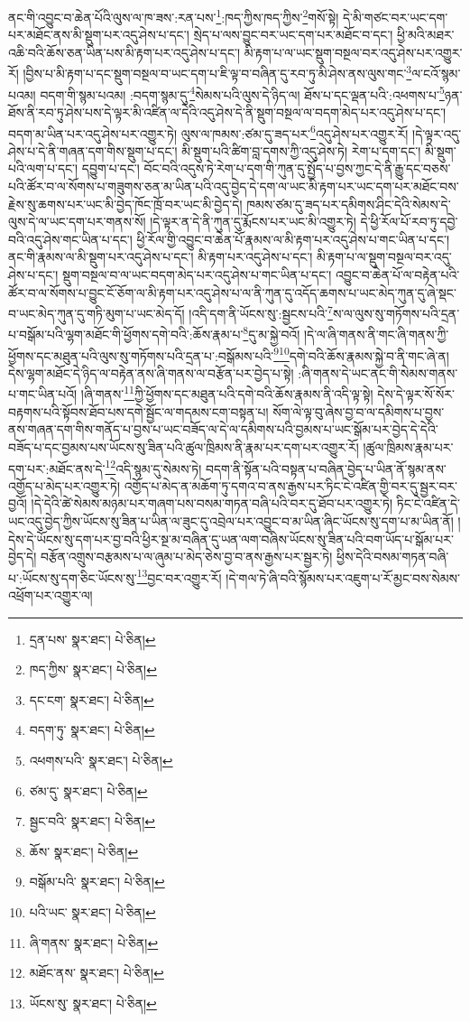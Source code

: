 ནང་གི་འབྱུང་བ་ཆེན་པོའི་ལུས་ལ་ཁ་ཟས་:རན་པས་\footnote{དྲན་པས་  སྣར་ཐང་།  པེ་ཅིན། }:ཁད་ཀྱིས་ཁད་ཀྱིས་\footnote{ཁད་ཀྱིས་  སྣར་ཐང་།  པེ་ཅིན། }གསོ་སྟེ། དེ་མི་གཙང་བར་ཡང་དག་པར་མཐོང་ནས་མི་སྡུག་པར་འདུ་ཤེས་པ་དང་། སྲེད་པ་ལས་བྱུང་བར་ཡང་དག་པར་མཐོང་བ་དང་། ཕྱི་མའི་མཐར་འཆི་བའི་ཆོས་ཅན་ཡིན་པས་མི་རྟག་པར་འདུ་ཤེས་པ་དང་། མི་རྟག་པ་ལ་ཡང་སྡུག་བསྔལ་བར་འདུ་ཤེས་པར་འགྱུར་རོ། །བྱིས་པ་མི་རྟག་པ་དང་སྡུག་བསྔལ་བ་ཡང་དག་པ་ཇི་ལྟ་བ་བཞིན་དུ་རབ་ཏུ་མི་ཤེས་ནས་ལུས་གང་\footnote{དང་ངག་  སྣར་ཐང་།  པེ་ཅིན། }ལ་ངའོ་སྙམ་པའམ། བདག་གི་སྙམ་པའམ། :བདག་སྙམ་དུ་\footnote{བདག་ཏུ་  སྣར་ཐང་།  པེ་ཅིན། }སེམས་པའི་ལུས་དེ་ཉིད་ལ། ཐོས་པ་དང་ལྡན་པའི་:འཕགས་པ་\footnote{འཕགས་པའི་  སྣར་ཐང་།  པེ་ཅིན། }ཉན་ཐོས་ནི་རབ་ཏུ་ཤེས་པས་དེ་ལྟར་མི་འཛིན་ལ་དེའི་འདུ་ཤེས་དེ་ནི་སྡུག་བསྔལ་ལ་བདག་མེད་པར་འདུ་ཤེས་པ་དང་། བདག་མ་ཡིན་པར་འདུ་ཤེས་པར་འགྱུར་ཏེ། ལུས་ལ་ཁམས་:ཙམ་དུ་ཟད་པར་\footnote{ཙམ་དུ་  སྣར་ཐང་།  པེ་ཅིན། }འདུ་ཤེས་པར་འགྱུར་རོ། །དེ་ལྟར་འདུ་ཤེས་པ་དེ་ནི་གཞན་དག་གིས་སྡུག་པ་དང་། མི་སྡུག་པའི་ཚིག་བླ་དགས་ཀྱི་འདུ་ཤེས་ཏེ། རེག་པ་དག་དང་། མི་སྡུག་པའི་ལག་པ་དང་། དབྱུག་པ་དང་། བོང་བའི་འདུས་ཏེ་རེག་པ་དག་གི་ཀུན་དུ་སྤྱོད་པ་བྱས་ཀྱང་དེ་ནི་རྒྱུ་དང་བཅས་པའི་ཚོར་བ་ལ་སོགས་པ་གཟུགས་ཅན་མ་ཡིན་པའི་འདུ་བྱེད་དེ་དག་ལ་ཡང་མི་རྟག་པར་ཡང་དག་པར་མཐོང་བས་རྗེས་སུ་ཆགས་པར་ཡང་མི་བྱེད་ཁོང་ཁྲོ་བར་ཡང་མི་བྱེད་དེ། ཁམས་ཙམ་དུ་ཟད་པར་དམིགས་ཤིང་དེའི་སེམས་དེ་ལུས་དེ་ལ་ཡང་དག་པར་གནས་སོ། །དེ་ལྟར་ན་དེ་ནི་ཀུན་དུ་རྨོངས་པར་ཡང་མི་འགྱུར་ཏེ། དེ་ཕྱི་རོལ་པོ་རབ་ཏུ་དབྱེ་བའི་འདུ་ཤེས་གང་ཡིན་པ་དང་། ཕྱི་རོལ་གྱི་འབྱུང་བ་ཆེན་པོ་རྣམས་ལ་མི་རྟག་པར་འདུ་ཤེས་པ་གང་ཡིན་པ་དང་། ནང་གི་རྣམས་ལ་མི་སྡུག་པར་འདུ་ཤེས་པ་དང་། མི་རྟག་པར་འདུ་ཤེས་པ་དང་། མི་རྟག་པ་ལ་སྡུག་བསྔལ་བར་འདུ་ཤེས་པ་དང་། སྡུག་བསྔལ་བ་ལ་ཡང་བདག་མེད་པར་འདུ་ཤེས་པ་གང་ཡིན་པ་དང་། འབྱུང་བ་ཆེན་པོ་ལ་བརྟེན་པའི་ཚོར་བ་ལ་སོགས་པ་བྱུང་ངོ་ཅོག་ལ་མི་རྟག་པར་འདུ་ཤེས་པ་ལ་ནི་ཀུན་དུ་འདོད་ཆགས་པ་ཡང་མེད་ཀུན་དུ་ཞེ་སྡང་བ་ཡང་མེད་ཀུན་དུ་གཏི་མུག་པ་ཡང་མེད་དོ། །འདི་དག་ནི་ཡོངས་སུ་:སྦྱངས་པའི་\footnote{སྦྱང་བའི་  སྣར་ཐང་།  པེ་ཅིན། }ས་ལ་ལུས་སུ་གཏོགས་པའི་དྲན་པ་བསྒོམ་པའི་ལྷག་མཐོང་གི་ཕྱོགས་དགེ་བའི་:ཆོས་རྣམ་པ་\footnote{ཆོས་  སྣར་ཐང་།  པེ་ཅིན། }དུ་མ་སྐྱེ་བའོ། །དེ་ལ་ཞི་གནས་ནི་གང་ཞི་གནས་ཀྱི་ཕྱོགས་དང་མཐུན་པའི་ལུས་སུ་གཏོགས་པའི་དྲན་པ་:བསྒོམས་པའི་\footnote{བསྒོམ་པའི་  སྣར་ཐང་།  པེ་ཅིན། }\footnote{པའི་ཡང་  སྣར་ཐང་།  པེ་ཅིན། }དགེ་བའི་ཆོས་རྣམས་སྐྱེ་བ་ནི་གང་ཞེ་ན། དེས་ལྷག་མཐོང་དེ་ཉིད་ལ་བརྟེན་ནས་ཞི་གནས་ལ་བརྩོན་པར་བྱེད་པ་སྟེ། :ཞི་གནས་དེ་ཡང་ནང་གི་སེམས་གནས་པ་གང་ཡིན་པའོ། །ཞི་གནས་\footnote{ཞི་གནས་  སྣར་ཐང་།  པེ་ཅིན། }ཀྱི་ཕྱོགས་དང་མཐུན་པའི་དགེ་བའི་ཆོས་རྣམས་ནི་འདི་ལྟ་སྟེ། དེས་དེ་ལྟར་སོ་སོར་བརྟགས་པའི་སྟོབས་ཐོབ་པས་དགེ་སྦྱོང་ལ་གདམས་ངག་བསྟན་པ། སོག་ལེ་ལྟ་བུ་ཞེས་བྱ་བ་ལ་དམིགས་པ་བྱས་ནས་གཞན་དག་གིས་གནོད་པ་བྱས་པ་ཡང་བཟོད་ལ་དེ་ལ་དམིགས་པའི་བྱམས་པ་ཡང་སྒོམ་པར་བྱེད་དེ་དེའི་བཟོད་པ་དང་བྱམས་པས་ཡོངས་སུ་ཟིན་པའི་ཚུལ་ཁྲིམས་ནི་རྣམ་པར་དག་པར་འགྱུར་རོ། །ཚུལ་ཁྲིམས་རྣམ་པར་དག་པར་:མཐོང་ནས་དེ་\footnote{མཐོང་ནས་  སྣར་ཐང་།  པེ་ཅིན། }འདི་སྙམ་དུ་སེམས་ཏེ། བདག་ནི་སྟོན་པའི་བསྟན་པ་བཞིན་བྱེད་པ་ཡིན་ནོ་སྙམ་ནས་འགྱོད་པ་མེད་པར་འགྱུར་ཏེ། འགྱོད་པ་མེད་ན་མཆོག་ཏུ་དགའ་བ་ནས་རྒྱས་པར་ཏིང་ངེ་འཛིན་གྱི་བར་དུ་སྦྱར་བར་བྱའོ། །དེ་དེའི་ཚེ་སེམས་མཉམ་པར་གཞག་པས་བསམ་གཏན་བཞི་པའི་བར་དུ་ཐོབ་པར་འགྱུར་ཏེ། ཏིང་ངེ་འཛིན་དེ་ཡང་འདུ་བྱེད་ཀྱིས་ཡོངས་སུ་ཟིན་པ་ཡིན་ལ་ཟུང་དུ་འབྲེལ་པར་འབྱུང་བ་མ་ཡིན་ཞིང་ཡོངས་སུ་དག་པ་མ་ཡིན་ནོ། །དེས་དེ་ཡོངས་སུ་དག་པར་བྱ་བའི་ཕྱིར་སྔ་མ་བཞིན་དུ་ཡན་ལག་བཞིས་ཡོངས་སུ་ཟིན་པའི་བག་ཡོད་པ་སྒོམ་པར་བྱེད་དེ། བརྩོན་འགྲུས་བརྩམས་པ་ལ་ཞུམ་པ་མེད་ཅེས་བྱ་བ་ནས་རྒྱས་པར་སྦྱར་ཏེ། ཕྱིས་དེའི་བསམ་གཏན་བཞི་པ་:ཡོངས་སུ་དག་ཅིང་ཡོངས་སུ་\footnote{ཡོངས་སུ་  སྣར་ཐང་།  པེ་ཅིན། }བྱང་བར་འགྱུར་རོ། །དེ་གལ་ཏེ་ཞི་བའི་སྙོམས་པར་འཇུག་པ་རོ་མྱང་བས་སེམས་འཕྲོག་པར་འགྱུར་ལ། 